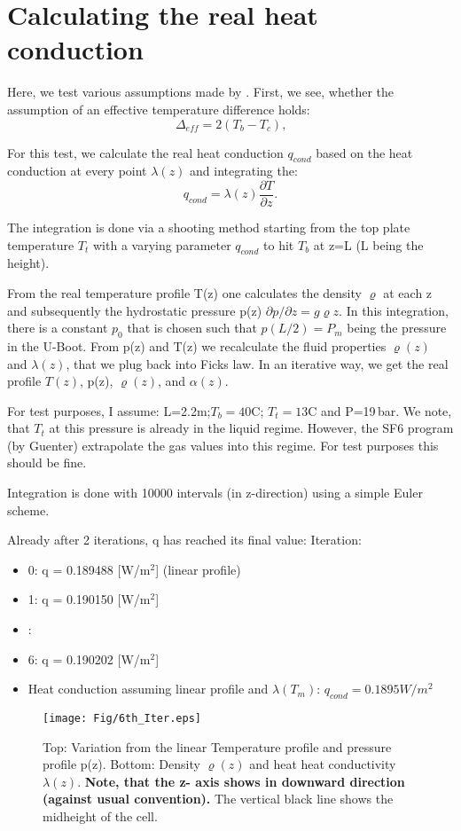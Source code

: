 \documentclass[11pt]{article}
\begin{document}
\section{Calculating the real heat conduction}
Here, we test various assumptions made by \cite{SU15}.
First, we see, whether the assumption of an effective temperature difference holds:
\[
\Delta_{eff} = 2(T_b-T_c)\mbox{,}
\]

For this test, we calculate the real heat conduction $q_{cond}$ based on the heat conduction at every point
$\lambda(z)$ and integrating the:
\[
q_{cond} = \lambda(z) \frac{\partial T}{\partial z}\mbox{.}
\]

The integration is done via a shooting method starting from the top plate temperature $T_t$ with a varying
parameter $q_{cond}$ to hit $T_b$ at z=L (L being the height). 

From the real temperature profile T(z) one calculates the density $\varrho$ at each z and subsequently the
hydrostatic pressure p(z) $\partial p /\partial z = g\varrho z$. In this integration, there is a constant $p_0$
that is chosen such that $p(L/2) = P_m$ being the pressure in the U-Boot. From p(z) and T(z) we recalculate
the fluid properties $\varrho(z)$ and $\lambda(z)$, that we plug back into Ficks law. In an iterative way, we
get the real profile $T(z)$, p(z), $\varrho(z)$, and $\alpha(z)$.

For test purposes, I assume: L=2.2m;$T_b=40$C; $T_t=13$C and P=19\,bar. We note, that $T_t$ at this pressure
is already in the liquid regime. However, the SF6 program (by Guenter) extrapolate the gas values into this
regime. For test purposes this should be fine.

Integration is done with 10000 intervals (in z-direction) using a simple Euler scheme.

Already after 2 iterations, q has reached its final value:
Iteration:
\begin{itemize}
 \item 	0: q = 0.189488 [W/m$^2$] (linear profile)
 \item 	1: q = 0.190150 [W/m$^2$]
 \item 	 :
 \item 	6: q = 0.190202 [W/m$^2$] 
 \item Heat conduction assuming linear profile and $\lambda(T_m)$: $q_{cond}= 0.1895 W/m^2$
\end{itemize}

\begin{figure}[htpb]
\centering
\texttt{[image: Fig/6th\_Iter.eps]}
\caption{Top: Variation from the linear Temperature profile and pressure profile p(z).
Bottom: Density $\varrho(z)$ and heat heat conductivity $\lambda(z)$. {\bf Note, that the z- axis shows in downward
direction (against usual convention).} The vertical black line shows the midheight of the cell.}
\label{fig:Iter}
\end{figure}
\end{document}
